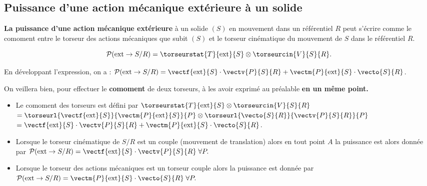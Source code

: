 \subsection{Puissance d'une action mécanique extérieure à un solide}
\begin{defi}
\textbf{La puissance d'une action mécanique extérieure} à un solide $(S)$ en mouvement dans un référentiel $R$ peut s'écrire comme le comoment entre le torseur des actions mécaniques que subit $(S)$ et le torseur cinématique du mouvement de $S$ dans le référentiel $R$.

$$
\mathcal{P}(\text{ext} \rightarrow S/R)=\torseurstat{T}{\text{ext}}{S}\otimes \torseurcin{V}{S}{R}.
$$

En développant l'expression, on a :
$\mathcal{P}(\text{ext} \rightarrow S/R)=\vectf{\text{ext}}{S}\cdot \vectv{P}{S}{R}+ \vectm{P}{\text{ext}}{S}\cdot\vecto{S}{R}$.
\end{defi}



\begin{warn}
On veillera bien, pour effectuer le \textbf{comoment} de deux torseurs, à les avoir exprimé au préalable {\textbf{en un même point.}}
\end{warn}

\begin{rem}%
\begin{itemize}
\item Le comoment des torseurs est défini par 
$\torseurstat{T}{\text{ext}}{S}\otimes \torseurcin{V}{S}{R}$
$=
\torseurl{\vectf{\text{ext}}{S}}{\vectm{P}{\text{ext}}{S}}{P}
\otimes \torseurl{\vecto{S}{R}}{\vectv{P}{S}{R}}{P}$ 
$=\vectf{\text{ext}}{S}\cdot \vectv{P}{S}{R}+ \vectm{P}{\text{ext}}{S}\cdot\vecto{S}{R}$.

\item Lorsque le torseur cinématique de $S/R$ est un couple (mouvement de translation) alors en tout point $A$ la puissance est alors donnée par
$
\mathcal{P}(\text{ext} \rightarrow S/R)=\vectf{\text{ext}}{S}\cdot \vectv{P}{S}{R} \;
\forall P.
$

\item Lorsque le torseur des actions mécaniques est un torseur couple alors la puissance est donnée par
$
\mathcal{P}(\text{ext} \rightarrow S/R)=\vectm{P}{\text{ext}}{S}\cdot\vecto{S}{R}\;
\forall P.
$

\end{itemize}
\end{rem}%



